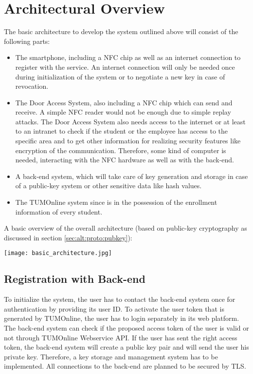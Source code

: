 \section{Architectural Overview}\label{sec:arch}

The basic architecture to develop the system outlined above will consist of the following parts:

\begin{itemize}
\item The smartphone, including a NFC chip as well as an internet connection to register with the service.
An internet connection will only be needed once during initialization of the system or to negotiate a new key in case of revocation.
\item The Door Access System, also including a NFC chip which can send and receive. A simple NFC reader would not be enough due to simple replay attacks. The Door Access System also needs access to the internet or at least to an intranet to check if the student or the employee has access to the specific area and to get other information for realizing security features like encryption of the communication. Therefore, some kind of computer is needed, interacting with the NFC hardware as well as with the back-end.
\item A back-end system, which will take care of key generation and storage in case of a public-key system or other sensitive data like hash values.

\item The TUMOnline system since is in the possession of the enrollment information of every student.
\end{itemize} 
%
A basic overview of the overall architecture (based on public-key cryptography as discussed in section \ref{sec:alt:proto:pubkey}): \newline
 \begin{center}
	\texttt{[image: basic\_architecture.jpg]}
\end{center}


\subsection{Registration with Back-end}
To initialize the system, the user has to contact the back-end system once for authentication by providing its user ID.
To activate the user token that is generated by TUMOnline, the user has to login separately in its web platform. 
The back-end system can check if the proposed access token of the user is valid or not through TUMOnline Webservice API.
If the user has sent the right access token, the back-end system will create a public key pair and will send the user his private key. Therefore, a key storage and management system has to be implemented.
All connections to the back-end are planned to be secured by TLS.


